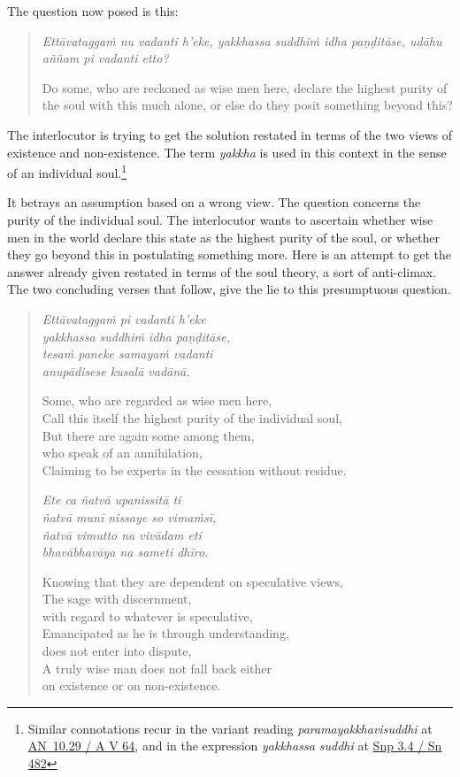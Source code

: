 The question now posed is this:

\begin{quote}
\emph{Ettāvataggaṁ nu vadanti h'eke, yakkhassa suddhiṁ idha paṇḍitāse, udāhu aññam pi vadanti etto?}

Do some, who are reckoned as wise men here, declare the highest purity of the soul with this much alone, or else do they posit something beyond this?
\end{quote}

The interlocutor is trying to get the solution restated in terms of the two views of existence and non-existence. The term \emph{yakkha} is used in this context in the sense of an individual soul.\footnote{Similar connotations recur in the variant reading \emph{paramayakkhavisuddhi} at \href{https://suttacentral.net/an10.29/pli/ms}{AN~10.29 / A V 64}, and in the expression \emph{yakkhassa suddhi} at \href{https://suttacentral.net/snp3.4/pli/ms}{Snp 3.4 / Sn 482}}

It betrays an assumption based on a wrong view. The question concerns the purity of the individual soul. The interlocutor wants to ascertain whether wise men in the world declare this state as the highest purity of the soul, or whether they go beyond this in postulating something more. Here is an attempt to get the answer already given restated in terms of the soul theory, a sort of anti-climax. The two concluding verses that follow, give the lie to this presumptuous question.

\begin{quote}
\emph{Ettāvataggaṁ pi vadanti h'eke}\\
\emph{yakkhassa suddhiṁ idha paṇḍitāse,}\\
\emph{tesaṁ paneke samayaṁ vadanti}\\
\emph{anupādisese kusalā vadānā.}

\clearpage

Some, who are regarded as wise men here,\\
Call this itself the highest purity of the individual soul,\\
But there are again some among them,\\
\vin who speak of an annihilation,\\
Claiming to be experts in the cessation without residue.

\emph{Ete ca ñatvā upanissitā ti}\\
\emph{ñatvā munī nissaye so vimaṁsī,}\\
\emph{ñatvā vimutto na vivādam eti}\\
\emph{bhavābhavāya na sameti dhīro.}

Knowing that they are dependent on speculative views,\\
The sage with discernment,\\
\vin with regard to whatever is speculative,\\
Emancipated as he is through understanding,\\
\vin does not enter into dispute,\\
A truly wise man does not fall back either\\
\vin on existence or on non-existence.
\end{quote}


